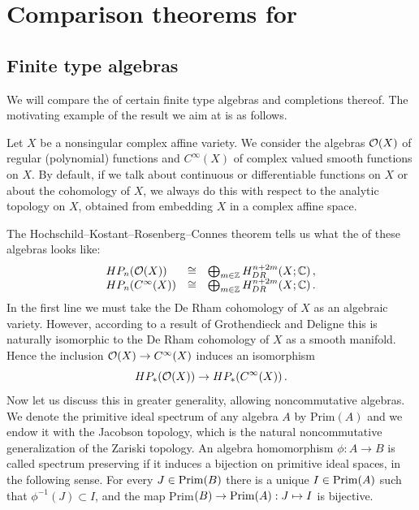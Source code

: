 \chapter{Comparison theorems for \pch}


\section{Finite type algebras}
\label{sec:1.1}

We will compare the \pch of certain finite type algebras and completions thereof. 
The motivating example of the result we aim at is as follows.

Let $X$ be a nonsingular complex affine variety. We consider the
algebras $\mathcal O (X)$ of regular (polynomial) functions and
$C^\infty (X)$ of complex valued smooth functions on $X$. By
default, if we talk about continuous or differentiable functions on
$X$ or about the cohomology of $X$, we always do this with respect
to the analytic topology on $X$, obtained from embedding $X$ in a
complex affine space.

The Hochschild--Kostant--Rosenberg--Connes theorem tells us what the
\pch of these algebras looks like:
\begin{equation}\label{eq:1.1}
\begin{array}{lll}
HP_n (\mathcal O (X)) & \cong &
\bigoplus_{m \in \mathbb Z} H_{DR}^{n+2m} (X ; \mathbb C) \,, \\
HP_n (C^\infty (X)) & \cong &
\bigoplus_{m \in \mathbb Z} H_{DR}^{n+2m} (X ; \mathbb C) \,.
\end{array}
\end{equation}
In the first line we must take the De Rham cohomology of $X$ as an
algebraic variety. However, according to a result of Grothendieck
and Deligne this is naturally isomorphic to the De Rham cohomology
of $X$ as a smooth manifold. Hence the inclusion $\mathcal O (X) \to
C^\infty (X)$ induces an isomorphism
\begin{equation}
HP_* (\mathcal O (X)) \to HP_* (C^\infty (X)) \,.
\end{equation}
Now let us discuss this in greater generality, allowing
noncommutative algebras. We denote the primitive ideal spectrum of
any algebra $A$ by Prim$(A)$ and we endow it with the Jacobson
topology, which is the natural noncommutative generalization of the
Zariski topology. An algebra homomorphism $\phi : A \to B$ is called
spectrum preserving if it induces a bijection on primitive ideal spaces,
in the following sense. For every $J \in \mathrm{Prim}(B)$ there is a 
unique $I \in \mathrm{Prim}(A)$ such that $\phi^{-1}(J) \subset I$,
and the map Prim$(B) \to \mathrm{Prim}(A) : J \mapsto I$ is bijective.


